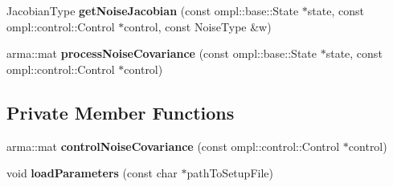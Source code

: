 \begin{DoxyCompactItemize}
\item 
\hypertarget{class_unicycle_motion_model_a62aa73b58447613c0745dab9453760b7}{\-Jacobian\-Type {\bfseries get\-Noise\-Jacobian} (const ompl\-::base\-::\-State $\ast$state, const ompl\-::control\-::\-Control $\ast$control, const \-Noise\-Type \&w)}\label{class_unicycle_motion_model_a62aa73b58447613c0745dab9453760b7}

\item 
\hypertarget{class_unicycle_motion_model_a1ae47461abed522cc1d611a1f60b6f7c}{arma\-::mat {\bfseries process\-Noise\-Covariance} (const ompl\-::base\-::\-State $\ast$state, const ompl\-::control\-::\-Control $\ast$control)}\label{class_unicycle_motion_model_a1ae47461abed522cc1d611a1f60b6f7c}

\end{DoxyCompactItemize}
\subsection*{\-Private \-Member \-Functions}
\begin{DoxyCompactItemize}
\item 
\hypertarget{class_unicycle_motion_model_acb8c6afd05d931f53d8bb7b30184b83e}{arma\-::mat {\bfseries control\-Noise\-Covariance} (const ompl\-::control\-::\-Control $\ast$control)}\label{class_unicycle_motion_model_acb8c6afd05d931f53d8bb7b30184b83e}

\item 
\hypertarget{class_unicycle_motion_model_ae932dca27f26105c4d91e809b304b58d}{void {\bfseries load\-Parameters} (const char $\ast$path\-To\-Setup\-File)}\label{class_unicycle_motion_model_ae932dca27f26105c4d91e809b304b58d}

\end{DoxyCompactItemize}
